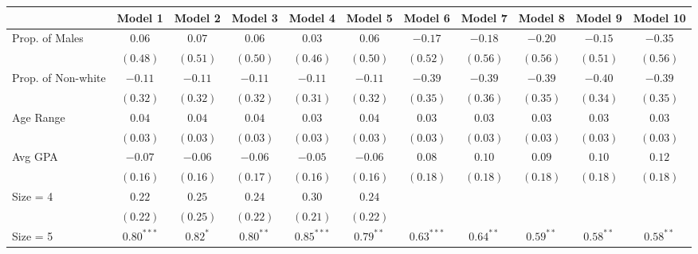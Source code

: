 \documentclass[]{article}
\begin{document}
\begin{landscape}

\begin{table}
\begin{center}
\begin{tabular}{l c c c c c c c c c c }
\hline
 & Model 1 & Model 2 & Model 3 & Model 4 & Model 5 & Model 6 & Model 7 & Model 8 & Model 9 & Model 10 \\
\hline
Prop. of Males             & $0.06$       & $0.07$     & $0.06$      & $0.03$       & $0.06$      & $-0.17$      & $-0.18$     & $-0.20$     & $-0.15$     & $-0.35$     \\
                           & $(0.48)$     & $(0.51)$   & $(0.50)$    & $(0.46)$     & $(0.50)$    & $(0.52)$     & $(0.56)$    & $(0.56)$    & $(0.51)$    & $(0.56)$    \\
Prop. of Non-white         & $-0.11$      & $-0.11$    & $-0.11$     & $-0.11$      & $-0.11$     & $-0.39$      & $-0.39$     & $-0.39$     & $-0.40$     & $-0.39$     \\
                           & $(0.32)$     & $(0.32)$   & $(0.32)$    & $(0.31)$     & $(0.32)$    & $(0.35)$     & $(0.36)$    & $(0.35)$    & $(0.34)$    & $(0.35)$    \\
Age Range                  & $0.04$       & $0.04$     & $0.04$      & $0.03$       & $0.04$      & $0.03$       & $0.03$      & $0.03$      & $0.03$      & $0.03$      \\
                           & $(0.03)$     & $(0.03)$   & $(0.03)$    & $(0.03)$     & $(0.03)$    & $(0.03)$     & $(0.03)$    & $(0.03)$    & $(0.03)$    & $(0.03)$    \\
Avg GPA                    & $-0.07$      & $-0.06$    & $-0.06$     & $-0.05$      & $-0.06$     & $0.08$       & $0.10$      & $0.09$      & $0.10$      & $0.12$      \\
                           & $(0.16)$     & $(0.16)$   & $(0.17)$    & $(0.16)$     & $(0.16)$    & $(0.18)$     & $(0.18)$    & $(0.18)$    & $(0.18)$    & $(0.18)$    \\
Size = 4                   & $0.22$       & $0.25$     & $0.24$      & $0.30$       & $0.24$      &              &             &             &             &             \\
                           & $(0.22)$     & $(0.25)$   & $(0.22)$    & $(0.21)$     & $(0.22)$    &              &             &             &             &             \\
Size = 5                   & $0.80^{***}$ & $0.82^{*}$ & $0.80^{**}$ & $0.85^{***}$ & $0.79^{**}$ & $0.63^{***}$ & $0.64^{**}$ & $0.59^{**}$ & $0.58^{**}$ & $0.58^{**}$ \\

\end{tabular}
\end{center}
\end{table}
\end{landscape}
\end{document}
